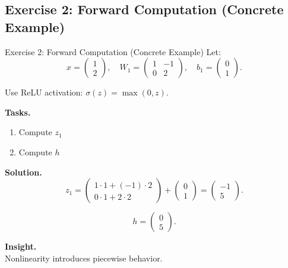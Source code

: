 \documentclass[aspectratio=169,11pt]{beamer}
\begin{document}
\subsection{Exercise 2: Forward Computation (Concrete Example)}
\begin{frame}[t,allowframebreaks]{Exercise 2: Forward Computation (Concrete Example)}
\small
Let:
\[
x = \begin{pmatrix}1 \\ 2\end{pmatrix}, \quad
W_1 =
\begin{pmatrix}
1 & -1 \\
0 & 2
\end{pmatrix}, \quad
b_1 = \begin{pmatrix}0 \\ 1\end{pmatrix}.
\]

Use ReLU activation: $\sigma(z) = \max(0,z)$.

\textbf{Tasks.}\\ \begin{enumerate}
    \item Compute $z_1$
    \item Compute $h$
\end{enumerate}

\textbf{Solution.}\\ \[
z_1 =
\begin{pmatrix}
1\cdot1 + (-1)\cdot2 \\
0\cdot1 + 2\cdot2
\end{pmatrix}
+
\begin{pmatrix}0 \\ 1\end{pmatrix}
=
\begin{pmatrix}-1 \\ 5\end{pmatrix}.
\]

\[
h = \begin{pmatrix}0 \\ 5\end{pmatrix}.
\]

\textbf{Insight.}\\ Nonlinearity introduces piecewise behavior.
\end{frame}
\end{document}
